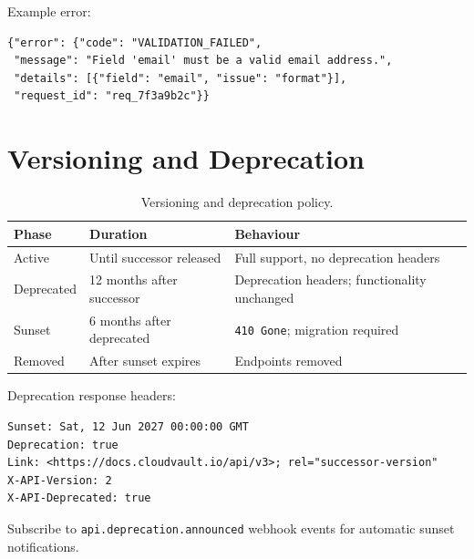 \documentclass[
    language=english,
    doctype=article,
    institution=none,
]{../../omnilatex}
\begin{document}
Example error:

\begin{verbatim}
{"error": {"code": "VALIDATION_FAILED",
 "message": "Field 'email' must be a valid email address.",
 "details": [{"field": "email", "issue": "format"}],
 "request_id": "req_7f3a9b2c"}}
\end{verbatim}

\section{Versioning and Deprecation}
\label{sec:versioning}
\begin{table}[htbp]
    \centering
    \caption{Versioning and deprecation policy.}
    \label{tab:versioning}
    \begin{tabularx}{\textwidth}{@{}lXX@{}}
        \toprule
        \textbf{Phase} & \textbf{Duration} & \textbf{Behaviour} \\
        \midrule
        Active       & Until successor released & Full support, no deprecation headers \\
        Deprecated   & 12 months after successor & Deprecation headers; functionality unchanged \\
        Sunset       & 6 months after deprecated & \texttt{410 Gone}; migration required \\
        Removed      & After sunset expires & Endpoints removed \\
        \bottomrule
    \end{tabularx}
\end{table}

Deprecation response headers:

\begin{verbatim}
Sunset: Sat, 12 Jun 2027 00:00:00 GMT
Deprecation: true
Link: <https://docs.cloudvault.io/api/v3>; rel="successor-version"
X-API-Version: 2
X-API-Deprecated: true
\end{verbatim}

\begin{notebox}
Subscribe to \texttt{api.deprecation.announced} webhook events for
automatic sunset notifications.
\end{notebox}
\end{document}
